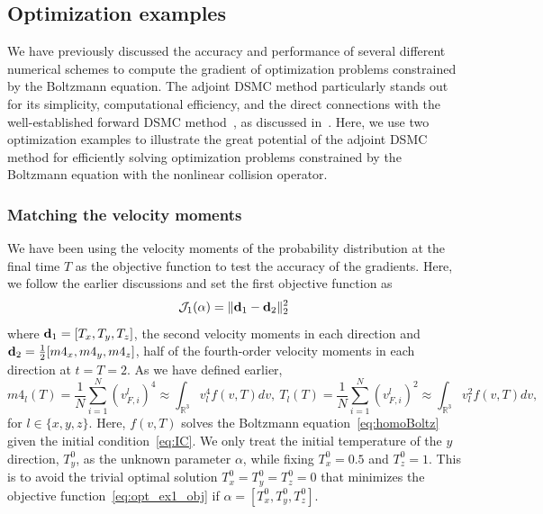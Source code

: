 \documentclass[times,final,nopreprintline]{elsarticle}
\newcommand{\bbR}{\mathbb R} \newcommand{\bbS}{\mathbb S}
\begin{document}











\subsection{Optimization examples}
We have previously discussed the accuracy and performance of several different numerical schemes to compute the gradient of optimization problems constrained by the Boltzmann equation. The adjoint DSMC method particularly stands out for its simplicity, computational efficiency, and the direct connections with the well-established forward DSMC method~\cite{nanbu1980direct}, as discussed in~. Here, we use two optimization examples to illustrate the great potential of the adjoint DSMC method for efficiently solving optimization problems constrained by the Boltzmann equation with the nonlinear collision operator.

\subsubsection{Matching the velocity moments}\label{sec:opt_ex1}
We have been using the velocity moments of the probability distribution at the final time $T$ as the objective function to test the accuracy of the gradients. Here, we follow the earlier discussions and set the first objective function as
\begin{equation}\label{eq:opt_ex1_obj}
\mathcal J_1(\alpha)= \|\mathbf d_1 - \mathbf d_2 \|_2^2
\end{equation}
where $\mathbf d_1 = [T_x, T_y, T_z]$, the second velocity moments in each direction and $\mathbf d_2 = \frac{1}{2}[m4_x, m4_y, m4_z]$, half of the fourth-order velocity moments in each direction at $t=T=2$. As we have defined earlier, $$m4_l(T)=\frac{1}{N}\sum_{i=1}^N{(v_{F,i}^l)^4 } \approx \int_{\bbR^3} v_l^4 f(v,T) dv,\  T_l(T)=\frac{1}{N}\sum_{i=1}^N{(v_{F,i}^l)^2 } \approx \int_{\bbR^3} v_l^2 f(v,T) dv,$$
for $l\in \{x,y,z\}$. Here, $f(v,T)$ solves the Boltzmann equation~\eqref{eq:homoBoltz} given the initial condition~\eqref{eq:IC}. We only treat the initial temperature of the $y$ direction, $T_y^0$, as the unknown parameter $\alpha$, while fixing $T_x^0 = 0.5$ and $T_z^0 = 1$. This is to avoid the trivial optimal solution $T_x^0 = T_y^0 = T_z^0 = 0$ that minimizes the objective function~\eqref{eq:opt_ex1_obj} if $\alpha = [T^0_x, T^0_y, T^0_z]$.
\end{document}

